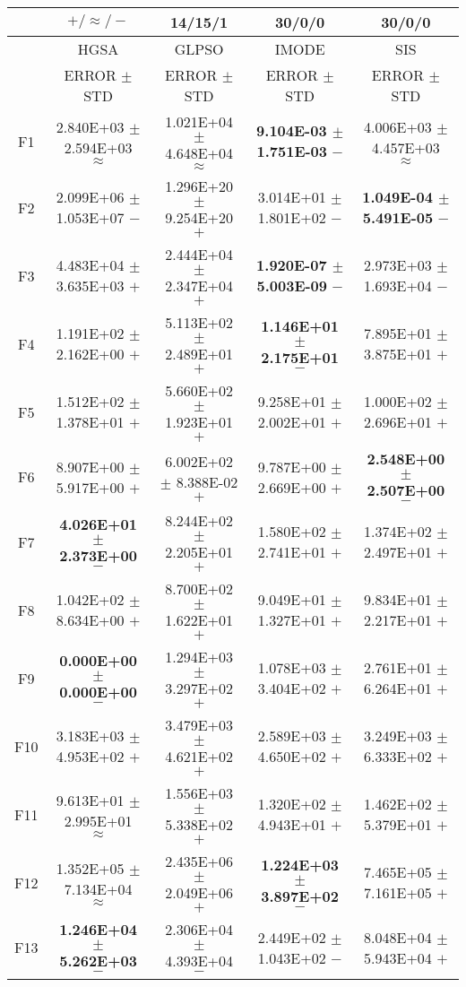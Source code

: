 \documentclass[paper]{ieice}
\begin{document}
\begin{table*}[htbp]
\begin{tabular}{c|c|c|c|c}
		&	$+/\approx/-$				&	14/15/1				&	30/0/0				&	30/0/0				\\ \hline
		
		&	HGSA				&	GLPSO				&	IMODE				&	SIS				\\   \cline{2-5}
		&	ERROR	$\pm$	STD		&	ERROR	$\pm$	STD		&	ERROR	$\pm$	STD		&	ERROR	$\pm$	STD		\\ \hline
		F1	&	2.840E+03	$\pm$	2.594E+03	$\approx$	&	1.021E+04	$\pm$	4.648E+04	$\approx$	&	\textbf{9.104E-03	$\pm$	1.751E-03}	$-$	&	4.006E+03	$\pm$	4.457E+03	$\approx$	\\
		F2	&	2.099E+06	$\pm$	1.053E+07	$-$	&	1.296E+20	$\pm$	9.254E+20	$+$	&	3.014E+01	$\pm$	1.801E+02	$-$	&	\textbf{1.049E-04	$\pm$	5.491E-05}	$-$	\\
		F3	&	4.483E+04	$\pm$	3.635E+03	$+$	&	2.444E+04	$\pm$	2.347E+04	$+$	&	\textbf{1.920E-07	$\pm$	5.003E-09}	$-$	&	2.973E+03	$\pm$	1.693E+04	$-$	\\
		F4	&	1.191E+02	$\pm$	2.162E+00	$+$	&	5.113E+02	$\pm$	2.489E+01	$+$	&	\textbf{1.146E+01	$\pm$	2.175E+01}	$-$	&	7.895E+01	$\pm$	3.875E+01	$+$	\\
		F5	&	1.512E+02	$\pm$	1.378E+01	$+$	&	5.660E+02	$\pm$	1.923E+01	$+$	&	9.258E+01	$\pm$	2.002E+01	$+$	&	1.000E+02	$\pm$	2.696E+01	$+$	\\
		F6	&	8.907E+00	$\pm$	5.917E+00	$+$	&	6.002E+02	$\pm$	8.388E-02	$+$	&	9.787E+00	$\pm$	2.669E+00	$+$	&	\textbf{2.548E+00	$\pm$	2.507E+00}	$-$	\\
		F7	&	\textbf{4.026E+01	$\pm$	2.373E+00}	$-$	&	8.244E+02	$\pm$	2.205E+01	$+$	&	1.580E+02	$\pm$	2.741E+01	$+$	&	1.374E+02	$\pm$	2.497E+01	$+$	\\
		F8	&	1.042E+02	$\pm$	8.634E+00	$+$	&	8.700E+02	$\pm$	1.622E+01	$+$	&	9.049E+01	$\pm$	1.327E+01	$+$	&	9.834E+01	$\pm$	2.217E+01	$+$	\\
		F9	&	\textbf{0.000E+00	$\pm$	0.000E+00}	$-$	&	1.294E+03	$\pm$	3.297E+02	$+$	&	1.078E+03	$\pm$	3.404E+02	$+$	&	2.761E+01	$\pm$	6.264E+01	$+$	\\
		F10	&	3.183E+03	$\pm$	4.953E+02	$+$	&	3.479E+03	$\pm$	4.621E+02	$+$	&	2.589E+03	$\pm$	4.650E+02	$+$	&	3.249E+03	$\pm$	6.333E+02	$+$	\\
		F11	&	9.613E+01	$\pm$	2.995E+01	$\approx$	&	1.556E+03	$\pm$	5.338E+02	$+$	&	1.320E+02	$\pm$	4.943E+01	$+$	&	1.462E+02	$\pm$	5.379E+01	$+$	\\
		F12	&	1.352E+05	$\pm$	7.134E+04	$\approx$	&	2.435E+06	$\pm$	2.049E+06	$+$	&	\textbf{1.224E+03	$\pm$	3.897E+02}	$-$	&	7.465E+05	$\pm$	7.161E+05	$+$	\\
		F13	&	\textbf{1.246E+04	$\pm$	5.262E+03}	$-$	&	2.306E+04	$\pm$	4.393E+04	$-$	&	2.449E+02	$\pm$	1.043E+02	$-$	&	8.048E+04	$\pm$	5.943E+04	$+$	\\

\end{tabular}
\end{table*}
\end{document}
